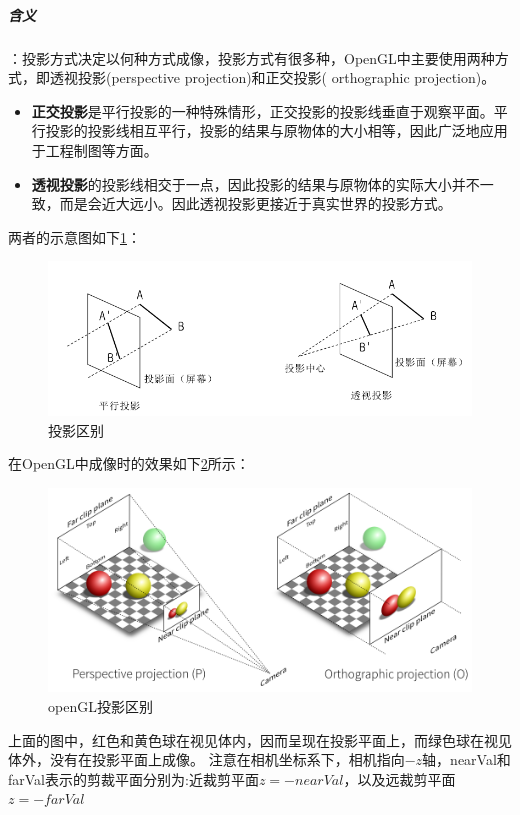 \documentclass[UTF8,a4paper,12pt]{ctexbook}
\begin{document}
			\subparagraph{含义}：投影方式决定以何种方式成像，投影方式有很多种，OpenGL中主要使用两种方式，即透视投影(perspective projection)和正交投影( orthographic projection)。
			\begin{itemize}[itemindent = 1em]
				\item \textbf{正交投影}是平行投影的一种特殊情形，正交投影的投影线垂直于观察平面。平行投影的投影线相互平行，投影的结果与原物体的大小相等，因此广泛地应用于工程制图等方面。 
				\item \textbf{透视投影}的投影线相交于一点，因此投影的结果与原物体的实际大小并不一致，而是会近大远小。因此透视投影更接近于真实世界的投影方式。
			\end{itemize}
			两者的示意图如下\ref{tyqb}：
			\begin{figure}[htbp]
				\centering
				\includegraphics[scale = 0.7]{project.png}
				\caption{投影区别}
				\label{tyqb}
			\end{figure}
			在OpenGL中成像时的效果如下\ref{touyingqubie}所示：
			   \begin{figure}[htbp]
			   	\centering
			   	\includegraphics[scale = 0.7]{project2.png}
			   	\caption{openGL投影区别}
			   	\label{touyingqubie}
			   \end{figure}
			上面的图中，红色和黄色球在视见体内，因而呈现在投影平面上，而绿色球在视见体外，没有在投影平面上成像。  注意在相机坐标系下，相机指向$-z$轴，nearVal和farVal表示的剪裁平面分别为:近裁剪平面$z=−nearVal$，以及远裁剪平面$z=−farVal$ 
			
\end{document}
